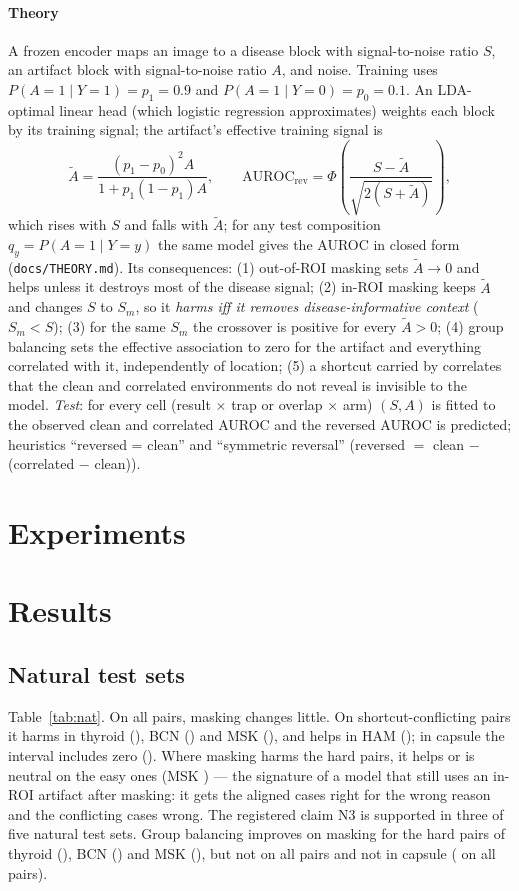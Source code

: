 \paragraph{Theory} A frozen encoder maps an image to a disease block with signal-to-noise ratio $S$, an artifact block with
signal-to-noise ratio $A$, and noise. Training uses $P(A{=}1\mid Y{=}1)=p_1=0.9$ and $P(A{=}1\mid Y{=}0)=p_0=0.1$. An
LDA-optimal linear head (which logistic regression approximates) weights each block by its training signal; the
artifact's effective training signal is
\[\tilde A=\frac{(p_1-p_0)^2A}{1+p_1(1-p_1)A},\qquad
\mathrm{AUROC}_{\text{rev}}=\Phi\!\left(\frac{S-\tilde A}{\sqrt{2(S+\tilde A)}}\right),\]
which rises with $S$ and falls with $\tilde A$; for any test composition $q_y=P(A{=}1\mid Y{=}y)$ the same model gives
the AUROC in closed form (\texttt{docs/THEORY.md}). Its consequences: (1) out-of-ROI masking sets $\tilde A\to0$ and helps
unless it destroys most of the disease signal; (2) in-ROI masking keeps $\tilde A$ and changes $S$ to $S_m$, so it
\emph{harms iff it removes disease-informative context} ($S_m<S$); (3) for the same $S_m$ the crossover is positive for
every $\tilde A>0$; (4) group balancing sets the effective association to zero for the artifact and everything
correlated with it, independently of location; (5) a shortcut carried by correlates that the clean and correlated
environments do not reveal is invisible to the model. \emph{Test}: for every cell (result $\times$ trap or overlap
$\times$ arm) $(S,A)$ is fitted to the observed clean and correlated AUROC and the reversed AUROC is predicted; heuristics
``reversed = clean'' and ``symmetric reversal'' (reversed $=$ clean $-$ (correlated $-$ clean)).

\section{Experiments}


\section{Results}
\subsection{Natural test sets}
Table~\ref{tab:nat}. On all pairs, masking changes little. On shortcut-conflicting pairs it harms in thyroid
(\sFiveNatthyroidhard), BCN (\sFiveNatisicBCNhard) and MSK (\sFiveNatisicMSKhard), and helps in HAM
(\sFiveNatisicHAMhard); in capsule the interval includes zero (\sFiveNatcapsulehard). Where masking harms the hard pairs,
it helps or is neutral on the easy ones (MSK \sFiveNatisicMSKeasy) --- the signature of a model that still uses an in-ROI
artifact after masking: it gets the aligned cases right for the wrong reason and the conflicting cases wrong. The
registered claim N3 is supported in three of five natural test sets. Group balancing improves on masking for the hard
pairs of thyroid (\sFiveNatBalthyroidhard), BCN (\sFiveNatBalisicBCNhard) and MSK (\sFiveNatBalisicMSKhard), but not on
all pairs and not in capsule (\sFiveNatBalcapsuleall{} on all pairs).


